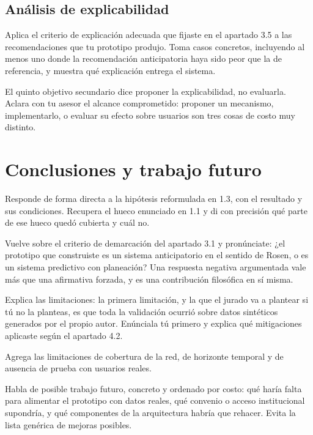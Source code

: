 \documentclass[letterpaper,12pt,oneside]{book}
\theoremstyle{definition}
\theoremstyle{plain}
\theoremstyle{remark}
\begin{document}
\section{Análisis de explicabilidad}
Aplica el criterio de explicación adecuada que fijaste en el apartado 3.5 a las recomendaciones que tu prototipo produjo. Toma casos concretos, incluyendo al menos uno donde la recomendación anticipatoria haya sido peor que la de referencia, y muestra qué explicación entrega el sistema.

El quinto objetivo secundario dice proponer la explicabilidad, no evaluarla. Aclara con tu asesor el alcance comprometido: proponer un mecanismo, implementarlo, o evaluar su efecto sobre usuarios son tres cosas de costo muy distinto.

\chapter{Conclusiones y trabajo futuro}
Responde de forma directa a la hipótesis reformulada en 1.3, con el resultado y sus condiciones. Recupera el hueco enunciado en 1.1 y di con precisión qué parte de ese hueco quedó cubierta y cuál no.

Vuelve sobre el criterio de demarcación del apartado 3.1 y pronúnciate: ¿el prototipo que construiste es un sistema anticipatorio en el sentido de Rosen, o es un sistema predictivo con planeación? Una respuesta negativa argumentada vale más que una afirmativa forzada, y es una contribución filosófica en sí misma.

Explica las limitaciones: la primera limitación, y la que el jurado va a plantear si tú no la planteas, es que toda la validación ocurrió sobre datos sintéticos generados por el propio autor. Enúnciala tú primero y explica qué mitigaciones aplicaste según el apartado 4.2.

Agrega las limitaciones de cobertura de la red, de horizonte temporal y de ausencia de prueba con usuarios reales.

Habla de posible trabajo futuro, concreto y ordenado por costo: qué haría falta para alimentar el prototipo con datos reales, qué convenio o acceso institucional supondría, y qué componentes de la arquitectura habría que rehacer. Evita la lista genérica de mejoras posibles.

\backmatter


\end{document}
